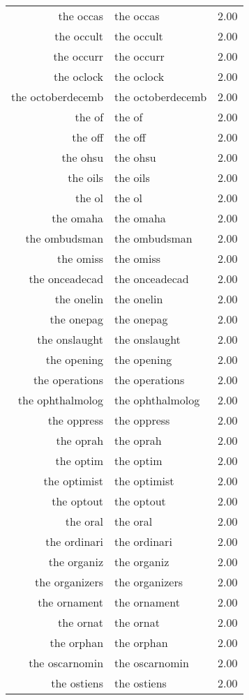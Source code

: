 \begin{table}[ht]
\begin{tabular}{rlr}
  the occas & the occas & 2.00 \\ 
  the occult & the occult & 2.00 \\ 
  the occurr & the occurr & 2.00 \\ 
  the oclock & the oclock & 2.00 \\ 
  the octoberdecemb & the octoberdecemb & 2.00 \\ 
  the of & the of & 2.00 \\ 
  the off & the off & 2.00 \\ 
  the ohsu & the ohsu & 2.00 \\ 
  the oils & the oils & 2.00 \\ 
  the ol & the ol & 2.00 \\ 
  the omaha & the omaha & 2.00 \\ 
  the ombudsman & the ombudsman & 2.00 \\ 
  the omiss & the omiss & 2.00 \\ 
  the onceadecad & the onceadecad & 2.00 \\ 
  the onelin & the onelin & 2.00 \\ 
  the onepag & the onepag & 2.00 \\ 
  the onslaught & the onslaught & 2.00 \\ 
  the opening & the opening & 2.00 \\ 
  the operations & the operations & 2.00 \\ 
  the ophthalmolog & the ophthalmolog & 2.00 \\ 
  the oppress & the oppress & 2.00 \\ 
  the oprah & the oprah & 2.00 \\ 
  the optim & the optim & 2.00 \\ 
  the optimist & the optimist & 2.00 \\ 
  the optout & the optout & 2.00 \\ 
  the oral & the oral & 2.00 \\ 
  the ordinari & the ordinari & 2.00 \\ 
  the organiz & the organiz & 2.00 \\ 
  the organizers & the organizers & 2.00 \\ 
  the ornament & the ornament & 2.00 \\ 
  the ornat & the ornat & 2.00 \\ 
  the orphan & the orphan & 2.00 \\ 
  the oscarnomin & the oscarnomin & 2.00 \\ 
  the ostiens & the ostiens & 2.00 \\ 

\end{tabular}
\end{table}
